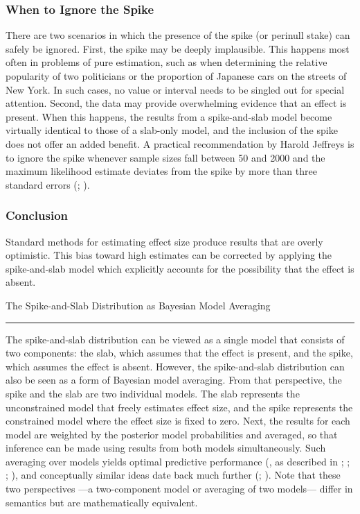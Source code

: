 \documentclass[a4paper]{article}
\begin{document}
\subsubsection*{When to Ignore the Spike}
There are two scenarios in which the presence of the spike (or perinull stake) can safely be ignored. First, the spike may be deeply implausible. This happens most often in problems of pure estimation, such as when determining the relative popularity of two politicians or the proportion of Japanese cars on the streets of New York. In such cases, no value or interval needs to be singled out for special attention. Second, the data may provide overwhelming evidence that an effect is present. When this happens, the results from a spike-and-slab model become virtually identical to those of a slab-only model, and the inclusion of the spike does not offer an added benefit. A practical recommendation by Harold Jeffreys is to ignore the spike whenever sample sizes fall between 50 and 2000 and the maximum likelihood estimate deviates from the spike by more than three standard errors (\cite[pp. 193--194]{Jeffreys1939}; \cite[p. 75]{Jeffreys1980}).



\subsubsection*{Conclusion}
Standard methods for estimating effect size produce results that are overly optimistic. This bias toward high estimates can be corrected by applying the spike-and-slab model which explicitly accounts for the possibility that the effect is absent. 

\newpage
\begin{NewBox2}[label=box:box1]{The Spike-and-Slab Distribution as Bayesian Model Averaging}{}%
	\vspace{6pt}\hrule\vspace{6pt}
	The spike-and-slab distribution can be viewed as a single model that consists of two components: the slab, which assumes that the effect is present, and the spike, which assumes the effect is absent.
	However, the spike-and-slab distribution can also be seen as a form of Bayesian model averaging.
	From that perspective, the spike and the slab are two individual models.
	The slab represents the unconstrained model that freely estimates effect size, and the spike represents the constrained model where the effect size is fixed to zero.
	Next, the results for each model are weighted by the posterior model probabilities and averaged, so that inference can be made using results from both models simultaneously.
	Such averaging over models yields optimal predictive performance (\cite[p. 640--641]{ZellnerVandaele1975}, as described in \cite[p. 600--601]{ZellnerSiow1980}; \cite[p. 57]{Haldane1932}; \cite{IversonEtAl2010}; \cite{RouderEtAl2018PBR}), and conceptually similar ideas date back much further (\cite[p. 387]{WrinchJeffreys1921}; \cite{Jevons18741913}).
	Note that these two perspectives ---a two-component model or averaging of two models--- differ in semantics but are mathematically equivalent.
\end{NewBox2}
\end{document}
